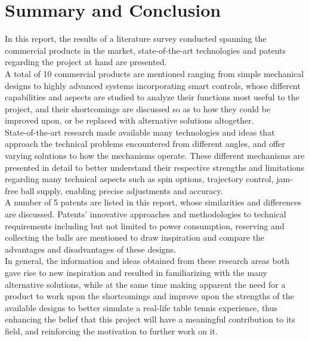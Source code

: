 \documentclass[12pt]{article}
\begin{document}
\section{Summary and Conclusion}
In this report, the results of a literature survey conducted spanning the commercial products in the market, state-of-the-art technologies and patents regarding the project at hand are presented. \\

A total of 10 commercial products are mentioned ranging from simple mechanical designs to highly advanced systems incorporating smart controls, whose different capabilities and aspects are studied to analyze their functions most useful to the project, and their shortcomings are discussed so as to how they could be improved upon, or be replaced with alternative solutions altogether. \\

State-of-the-art research made available many technologies and ideas that approach the technical problems encountered from different angles, and offer varying solutions to how the mechanisms operate. These different mechanisms are presented in detail to better understand their respective strengths and limitations regarding many technical aspects such as spin options, trajectory control, jam-free ball supply, enabling precise adjustments and accuracy. \\

A number of 5 patents are listed in this report, whose similarities and differences are discussed. Patents’ innovative approaches and methodologies to technical requirements including but not limited to power consumption, reserving and collecting the balls are mentioned to draw inspiration and compare the advantages and disadvantages of these designs. \\

In general, the information and ideas obtained from these research areas both gave rise to new inspiration and resulted in familiarizing with the many alternative solutions, while at the same time making apparent the need for a product to work upon the shortcomings and improve upon the strengths of the available designs to better simulate a real-life table tennis experience, thus enhancing the belief that this project will have a meaningful contribution to its field, and reinforcing the motivation to further work on it.

\newpage
\end{document}
